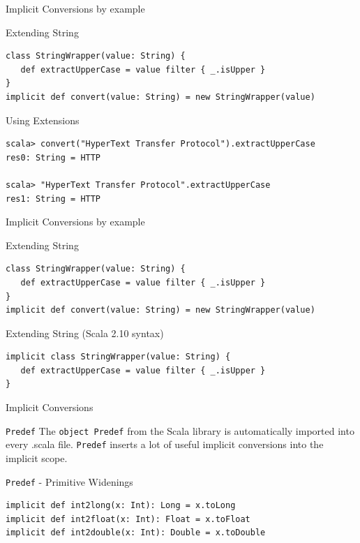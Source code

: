 \begin{frame}[fragile]{Implicit Conversions by example}
\begin{exampleblock}{Extending String}
\begin{lstlisting}
class StringWrapper(value: String) {
   def extractUpperCase = value filter { _.isUpper }
}
implicit def convert(value: String) = new StringWrapper(value)
\end{lstlisting}
\end{exampleblock}
\pause
\begin{exampleblock}{Using Extensions}
\begin{lstlisting}
scala> convert("HyperText Transfer Protocol").extractUpperCase
res0: String = HTTP

scala> "HyperText Transfer Protocol".extractUpperCase
res1: String = HTTP
\end{lstlisting}
\end{exampleblock}
\end{frame}

\begin{frame}[fragile]{Implicit Conversions by example}
\begin{exampleblock}{Extending String}
\begin{lstlisting}
class StringWrapper(value: String) {
   def extractUpperCase = value filter { _.isUpper }
}
implicit def convert(value: String) = new StringWrapper(value)
\end{lstlisting}
\end{exampleblock}
\begin{exampleblock}{Extending String (Scala 2.10 syntax)}
\begin{lstlisting}
implicit class StringWrapper(value: String) {
   def extractUpperCase = value filter { _.isUpper }
}
\end{lstlisting}
\end{exampleblock}
\end{frame}

\begin{frame}[fragile]{Implicit Conversions}
\begin{block}{\lstinline!Predef!}
The \lstinline!object Predef! from the Scala library is automatically imported
into every .scala file. \lstinline!Predef! inserts a lot of useful implicit
conversions into the implicit scope.
\end{block}
\pause
\begin{exampleblock}{\lstinline!Predef! - Primitive Widenings}
\begin{lstlisting}
implicit def int2long(x: Int): Long = x.toLong
implicit def int2float(x: Int): Float = x.toFloat
implicit def int2double(x: Int): Double = x.toDouble
\end{lstlisting}
\end{exampleblock}
\end{frame}

